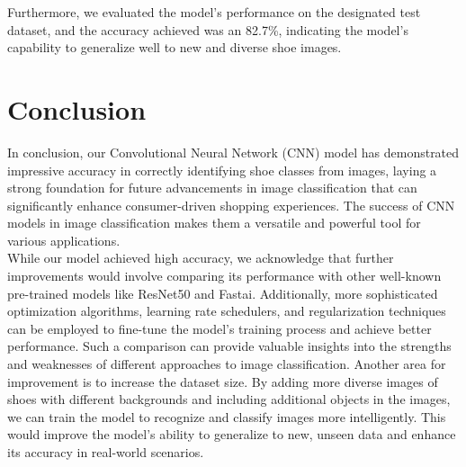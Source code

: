 \documentclass[11pt,a4paper]{article}
\begin{document}
\begin{table}[h!]
\centering
{}
\caption{Result of Model Training and Validation Accuracy After Additional Layers with Epochs}
\label{tab:refined_train_loss}
\end{table}

Furthermore, we evaluated the model's performance on the designated test dataset, and the accuracy achieved was an 82.7\%, indicating the model's capability to generalize well to new and diverse shoe images.

\section{Conclusion}
In conclusion, our Convolutional Neural Network (CNN) model has demonstrated impressive accuracy in correctly identifying shoe classes from images, laying a strong foundation for future advancements in image classification that can significantly enhance consumer-driven shopping experiences. The success of CNN models in image classification makes them a versatile and powerful tool for various applications. \\


\noindent While our model achieved high accuracy, we acknowledge that further improvements would involve comparing its performance with other well-known pre-trained models like ResNet50 and Fastai. Additionally, more sophisticated optimization algorithms, learning rate schedulers, and regularization techniques can be employed to fine-tune the model's training process and achieve better performance. Such a comparison can provide valuable insights into the strengths and weaknesses of different approaches to image classification. Another area for improvement is to increase the dataset size. By adding more diverse images of shoes with different backgrounds and including additional objects in the images, we can train the model to recognize and classify images more intelligently. This would improve the model's ability to generalize to new, unseen data and enhance its accuracy in real-world scenarios. \\
\end{document}
